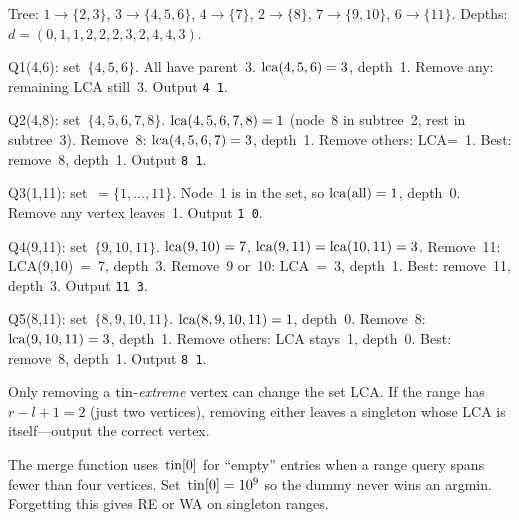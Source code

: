 \begin{tracebox}[CF 1062E: n=11, parents 1 1 3 3 3 4 2 7 7 6; 5 queries]
Tree: \(1\!\to\!\{2,3\}\), \(3\!\to\!\{4,5,6\}\), \(4\!\to\!\{7\}\),
\(2\!\to\!\{8\}\), \(7\!\to\!\{9,10\}\), \(6\!\to\!\{11\}\).
Depths: \(d=(0,1,1,2,2,2,3,2,4,4,3)\).

Q1\;(4,6): set~\(\{4,5,6\}\). All have parent~3.
\(\operatorname{lca}(4,5,6)=3\), depth~1. Remove any: remaining LCA still~3.
Output \texttt{4 1}. \checkmark

Q2\;(4,8): set~\(\{4,5,6,7,8\}\).
\(\operatorname{lca}(4,5,6,7,8)=1\) (node~8 in subtree~2, rest in subtree~3).
Remove~8: \(\operatorname{lca}(4,5,6,7)=3\), depth~1. Remove others: LCA=~1.
Best: remove~8, depth~1. Output \texttt{8 1}. \checkmark

Q3\;(1,11): set~\(=\{1,\ldots,11\}\). Node~1 is in the set,
so \(\operatorname{lca}(\text{all})=1\), depth~0. Remove any vertex leaves~1.
Output \texttt{1 0}. \checkmark

Q4\;(9,11): set~\(\{9,10,11\}\).
\(\operatorname{lca}(9,10)=7\), \(\operatorname{lca}(9,11)=\operatorname{lca}(10,11)=3\).
Remove~11: LCA(9,10)~=~7, depth~3. Remove~9 or~10: LCA~=~3, depth~1.
Best: remove~11, depth~3. Output \texttt{11 3}. \checkmark

Q5\;(8,11): set~\(\{8,9,10,11\}\).
\(\operatorname{lca}(8,9,10,11)=1\), depth~0.
Remove~8: \(\operatorname{lca}(9,10,11)=3\), depth~1.
Remove others: LCA stays~1, depth~0.
Best: remove~8, depth~1. Output \texttt{8 1}. \checkmark
\end{tracebox}


\begin{warningbox}
Only removing a \(\operatorname{tin}\)-\emph{extreme} vertex can change the set LCA.
If the range has \(r{-}l{+}1 = 2\) (just two vertices), removing either
leaves a singleton whose LCA is itself---output the correct vertex.
\end{warningbox}
\begin{warningbox}
The merge function uses~\(\operatorname{tin}[0]\) for ``empty'' entries when a range
query spans fewer than four vertices. Set~\(\operatorname{tin}[0] = 10^9\) so the
dummy never wins an argmin. Forgetting this gives RE or WA on
singleton ranges.
\end{warningbox}

